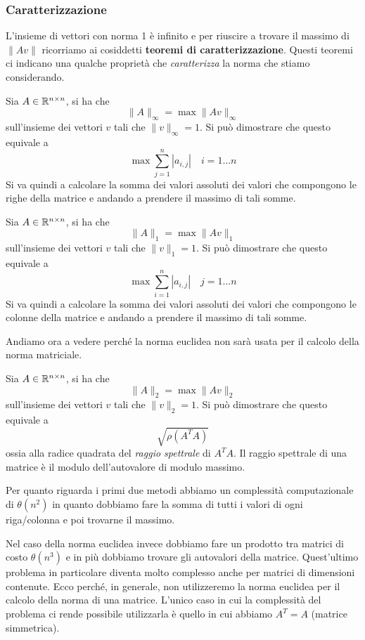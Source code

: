 \subsubsection{Caratterizzazione}
L'insieme di vettori con norma 1 è infinito e per riuscire a trovare il massimo di $\| A v \|$ ricorriamo ai
cosiddetti \textbf{teoremi di caratterizzazione}. Questi teoremi ci indicano una qualche  proprietà che
\emph{caratterizza} la norma che stiamo considerando.

\begin{theorem}
	Sia $A \in \mathbb{R}^{n \times n}$, si ha che
	\[ \| A \|_\infty = \max \| A v \|_\infty \]
	sull'insieme dei vettori $v$ tali che $\| v \|_\infty = 1$. Si può dimostrare che questo equivale a
	\[ \max \sum_{j=1}^n |a_{i,j}| \quad i = 1 \dots n \]
	Si va quindi a calcolare la somma dei valori assoluti dei valori che compongono le righe della matrice e
	andando a prendere il massimo di tali somme.
\end{theorem}

\begin{theorem}
	Sia $A \in \mathbb{R}^{n \times n}$, si ha che
	\[ \| A \|_1 = \max \| A v \|_1 \]
	sull'insieme dei vettori $v$ tali che $\| v \|_1 = 1$. Si può dimostrare che questo equivale a
	\[ \max \sum_{i=1}^n |a_{i,j}| \quad j = 1 \dots n \]
	Si va quindi a calcolare la somma dei valori assoluti dei valori che compongono le colonne della matrice e
	andando a prendere il massimo di tali somme.
\end{theorem}

Andiamo ora a vedere perché la norma euclidea non sarà usata per il calcolo della norma matriciale.

\begin{theorem}
	Sia $A \in \mathbb{R}^{n \times n}$, si ha che
	\[ \| A \|_2 = \max \| A v \|_2 \]
	sull'insieme dei vettori $v$ tali che $\| v \|_2 = 1$. Si può dimostrare che questo equivale a
	\[ \sqrt{\rho (A^T A)} \]
	ossia alla radice quadrata del \emph{raggio spettrale} di $A^T A$. Il raggio spettrale di una matrice è il
	modulo dell'autovalore di modulo massimo.
\end{theorem}

Per quanto riguarda i primi due metodi abbiamo un complessità computazionale di $\theta (n^2)$ in quanto dobbiamo
fare la somma di tutti i valori di ogni riga/colonna e poi trovarne il massimo.

Nel caso della norma euclidea invece dobbiamo fare un prodotto tra matrici di costo $\theta (n^3)$ e in più
dobbiamo trovare gli autovalori della matrice. Quest'ultimo problema in particolare diventa molto complesso anche
per matrici di dimensioni contenute. Ecco perché, in generale, non utilizzeremo la norma euclidea per il calcolo
della norma di una matrice. L'unico caso in cui la complessità del problema ci rende possibile utilizzarla è
quello in cui abbiamo $A^T = A$ (matrice simmetrica).
